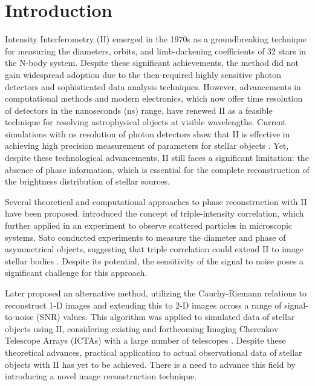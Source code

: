 \section{Introduction}

Intensity Interferometry (II) emerged in the 1970s as a groundbreaking technique for measuring the diameters, orbits, and limb-darkening coefficients of 32 stars in the N-body system. Despite these significant achievements, the method did not gain widespread adoption due to the then-required highly sensitive photon detectors and sophisticated data analysis techniques. However, advancements in computational methods and modern electronics, which now offer time resolution of detectors in the nanoseconds (ns) range, have renewed II as a feasible technique for resolving astrophysical objects at visible wavelengths. Current simulations with ns resolution of photon detectors show that II is effective in achieving high precision measurement of parameters for stellar objects \citep{10.1093/mnras/stab2391, 10.1093/mnras/stac2433}. Yet, despite these technological advancements, II still faces a significant limitation: the absence of phase information, which is essential for the complete reconstruction of the brightness distribution of stellar sources.

Several theoretical and computational approaches to phase reconstruction with II have been proposed. \cite{gamo1963triple} introduced the concept of triple-intensity correlation, which \cite{goldberger1963use} further applied in an experiment to observe scattered particles in microscopic systems. Sato conducted experiments to measure the diameter and phase of asymmetrical objects, suggesting that triple correlation could extend II to image stellar bodies \citep{sato1978imaging, sato1979computer, sato1981adaptive}. Despite its potential, the sensitivity of the signal to noise poses a significant challenge for this approach.

Later \cite{holmes2010two} proposed an alternative method, utilizing the Cauchy-Riemann relations to reconstruct 1-D images and extending this to 2-D images across a range of signal-to-noise (SNR) values. This algorithm was applied to simulated data of stellar objects using II, considering existing and forthcoming Imaging Cherenkov Telescope Arrays (ICTAs) with a large number of telescopes \citep{nunez2010stellar, nunez2012high, nunez2012imaging}. Despite these theoretical advances, practical application to actual observational data of stellar objects with II has yet to be achieved. There is a need to advance this field by introducing a novel image reconstruction technique.

